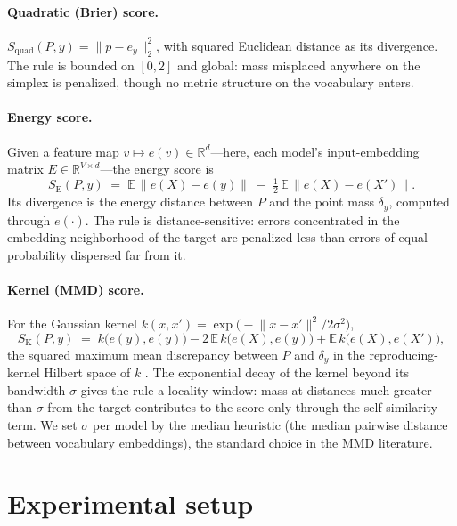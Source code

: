 \documentclass{article}
\newcommand{\Equad}{S_{\mathrm{quad}}}
\newcommand{\Eenergy}{S_{\mathrm{E}}}
\newcommand{\Ekernel}{S_{\mathrm{K}}}
\begin{document}
\paragraph{Quadratic (Brier) score.} $\Equad(P,y) = \lVert p - e_y\rVert_2^2$, with
squared Euclidean distance as its divergence. The rule is bounded on $[0,2]$ and global:
mass misplaced anywhere on the simplex is penalized, though no metric structure on the
vocabulary enters.

\paragraph{Energy score.} Given a feature map $v \mapsto e(v) \in \mathbb{R}^d$---here,
each model's input-embedding matrix $E \in \mathbb{R}^{V\times d}$---the energy score
\citep{gneiting2007,szekely2013} is
\begin{equation}
  \Eenergy(P,y) \;=\; \mathbb{E}\,\lVert e(X)-e(y)\rVert
  \;-\; \tfrac{1}{2}\,\mathbb{E}\,\lVert e(X)-e(X')\rVert .
  \label{eq:energy}
\end{equation}
Its divergence is the energy distance between $P$ and the point mass $\delta_y$,
computed through $e(\cdot)$. The rule is distance-sensitive: errors concentrated in the
embedding neighborhood of the target are penalized less than errors of equal probability
dispersed far from it.

\paragraph{Kernel (MMD) score.} For the Gaussian kernel
$k(x,x') = \exp\!\big(-\lVert x-x'\rVert^2 / 2\sigma^2\big)$,
\begin{equation}
  \Ekernel(P,y) \;=\; k\big(e(y),e(y)\big) - 2\,\mathbb{E}\,k\big(e(X), e(y)\big)
  + \mathbb{E}\,k\big(e(X), e(X')\big),
  \label{eq:kernel}
\end{equation}
the squared maximum mean discrepancy between $P$ and $\delta_y$ in the reproducing-kernel
Hilbert space of $k$ \citep{gretton2012,steinwart2021}. The exponential decay of the
kernel beyond its bandwidth $\sigma$ gives the rule a locality window: mass at distances
much greater than $\sigma$ from the target contributes to the score only through the
self-similarity term. We set $\sigma$ per model by the median heuristic (the median
pairwise distance between vocabulary embeddings), the standard choice in the MMD
literature.

\section{Experimental setup}
\label{sec:setup}
\end{document}
